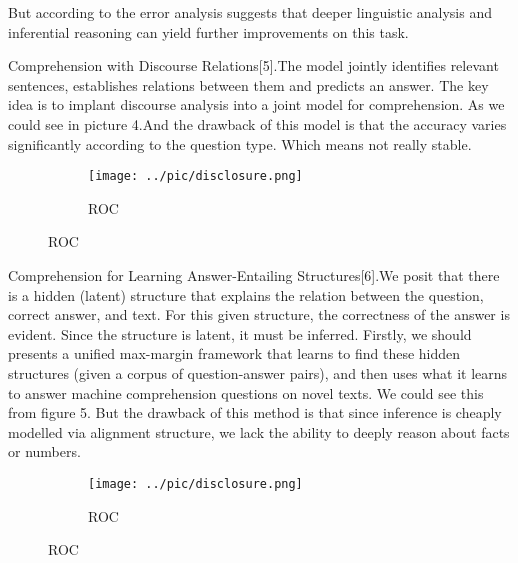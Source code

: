 \documentclass[runningheads,a4paper]{llncs}
\begin{document}
But according to the error analysis suggests that deeper linguistic analysis and inferential reasoning can yield further improvements on this task.


Comprehension with Discourse Relations[5].The model jointly identifies relevant sentences, establishes relations between them and predicts an answer. The key idea is to implant discourse analysis into a joint model for comprehension. As we could see in picture 4.And the drawback of this model is that the accuracy varies significantly according to the question type. Which means not really stable. 
\begin{figure}[p]
	\centering
	\begin{subfigure}{.5\textwidth}
		\centering
		\texttt{[image: ../pic/disclosure.png]}
		\caption{ROC}
		\label{figure 4:disclosure method}
	\end{subfigure}
\end{figure}

Comprehension for Learning Answer-Entailing Structures[6].We posit that there is a hidden (latent) structure that explains the relation between the question, correct answer, and text. For this given structure, the correctness of the answer is evident. Since the structure is latent, it must be inferred. Firstly, we should presents a unified max-margin framework that learns to find these hidden structures (given a corpus of question-answer pairs), and then uses what it learns to answer machine comprehension questions on novel texts. We could see this from figure 5. But the drawback of this method is that since inference is cheaply modelled via alignment structure, we lack the ability to deeply reason about facts or numbers. 
\begin{figure}[p]
	\centering
	\begin{subfigure}{.5\textwidth}
		\centering
		\texttt{[image: ../pic/disclosure.png]}
		\caption{ROC}
		\label{figure 5:answer entailing method}
	\end{subfigure}
\end{figure}
\end{document}
